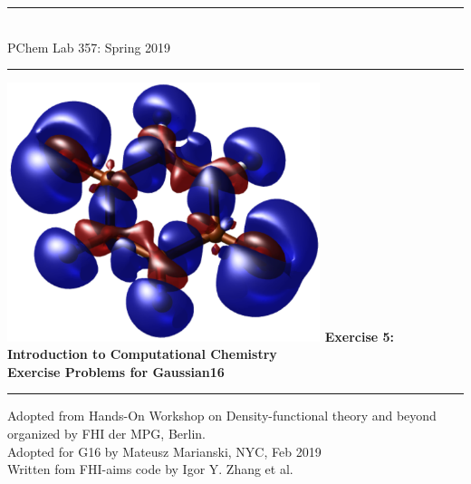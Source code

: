 \documentclass[nobib,nofonts,nols,nohyper]{tufte-handout}
\begin{document}

\thispagestyle{empty}
\begin{fullwidth}
  \begin{center}\huge\bfseries
    \rule{1.5\textwidth}{1pt}
    \\
    PChem Lab 357: Spring 2019 
    \\
    \vspace{0.5cm}
    \rule{1.5\textwidth}{1pt}
  \end{center}
  \vfill
  \begin{center}\LARGE\bfseries
    \includegraphics[height=7.55cm]{pics/cover.png}
    \vfill
    Exercise 5: Introduction to Computational Chemistry\\ 
    Exercise Problems for Gaussian16
  \end{center}
  \vfill
  \begin{center}\large\bfseries
    \rule{1.5\textwidth}{1pt}
    \vfill
    Adopted from Hands-On Workshop on Density-functional theory and beyond organized by FHI der MPG, Berlin.  \\
    Adopted for G16 by Mateusz Marianski, NYC, Feb 2019 \\ 
    Written fom FHI-aims code by Igor Y. Zhang et al.%
  \end{center}
\end{fullwidth}

\clearpage




%


%
\clearpage

\appendix
%

\vfill


%
%
\end{document}
